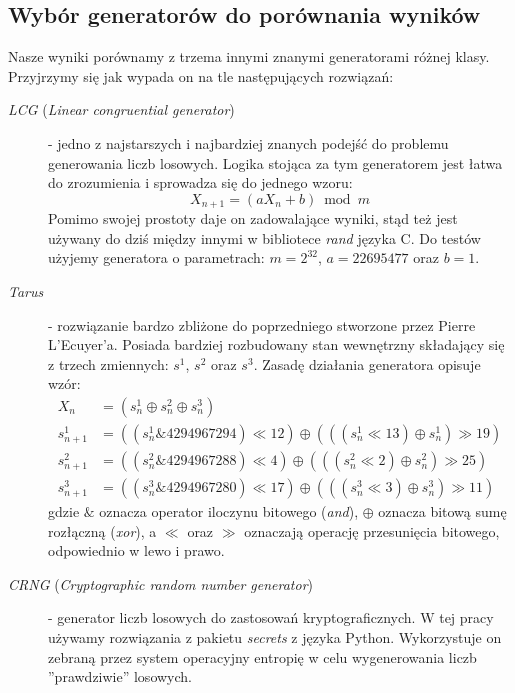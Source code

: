 \subsection{Wybór generatorów do porównania wyników}
Nasze wyniki porównamy z trzema innymi znanymi generatorami różnej klasy. Przyjrzymy się jak wypada on na tle następujących rozwiązań:
\begin{description}
    \item[\textit{LCG} (\textit{Linear congruential generator})] - jedno z najstarszych i najbardziej znanych podejść do problemu generowania liczb losowych. Logika stojąca za tym generatorem jest łatwa do zrozumienia i sprowadza się do jednego wzoru:
    \begin{equation}
        \label{eq:lcg}
        X_{n+1} = (aX_n + b) \bmod m 
    \end{equation}
    Pomimo swojej prostoty daje on zadowalające wyniki, stąd też jest używany do dziś między innymi w bibliotece \emph{rand} języka C. Do testów użyjemy generatora o parametrach: $m=2^{32}$, $a=22695477$ oraz $b=1$.
    \item[\textit{Tarus}] - rozwiązanie bardzo zbliżone do poprzedniego stworzone przez Pierre L’Ecuyer'a. Posiada bardziej rozbudowany stan wewnętrzny składający się z trzech zmiennych: $s^1$, $s^2$ oraz $s^3$. Zasadę działania generatora opisuje wzór:
    \begin{equation}
        \label{eq:tarus}
        \begin{split}
            X_n &= (s^1_n \oplus s^2_n \oplus s^3_n)\\
            s^1_{n+1} &= ((s^1_n \mathbin{\&} 4294967294) \ll 12) \oplus (((s^1_n \ll 13) \oplus s^1_n) \gg 19)\\
            s^2_{n+1} &= ((s^2_n \mathbin{\&} 4294967288) \ll 4) \oplus (((s^2_n \ll 2) \oplus s^2_n) \gg 25)\\
            s^3_{n+1} &= ((s^3_n \mathbin{\&} 4294967280) \ll 17) \oplus (((s^3_n \ll 3) \oplus s^3_n) \gg 11)
        \end{split}
    \end{equation}
    gdzie $\mathbin{\&}$ oznacza operator iloczynu bitowego (\emph{and}), $\oplus$ oznacza bitową sumę rozłączną (\emph{xor}), a $\ll$ oraz $\gg$ oznaczają operację przesunięcia bitowego, odpowiednio w lewo i prawo.
    \item[\textit{CRNG} (\textit{Cryptographic random number generator})] - generator liczb losowych do zastosowań kryptograficznych. W tej pracy używamy rozwiązania z pakietu \emph{secrets} z języka Python. Wykorzystuje on zebraną przez system operacyjny entropię w celu wygenerowania liczb ''prawdziwie'' losowych.  
\end{description}

